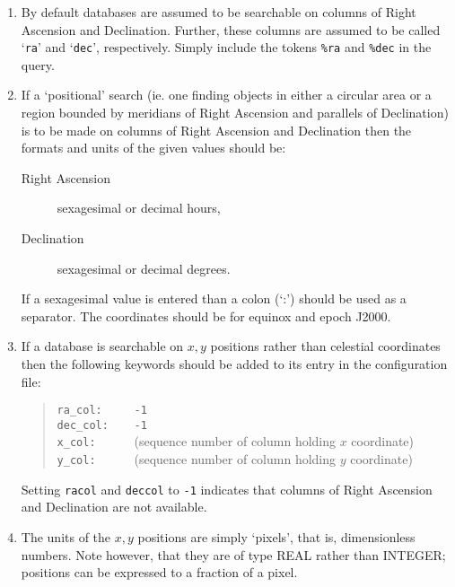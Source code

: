 \documentclass[twoside,11pt]{article}
\renewcommand{\_}{\texttt{\symbol{95}}}
\begin{document}
\begin{enumerate}

  \item By default databases are assumed to be searchable on columns
   of Right Ascension and Declination.  Further, these columns are
   assumed to be called `{\tt ra}' and `{\tt dec}', respectively.
   Simply include the tokens {\tt \%ra} and {\tt \%dec} in the query.

  \item If a `positional' search (ie. one finding objects in either a
   circular area or a region bounded by meridians of Right Ascension and
   parallels of Declination) is to be made on columns of Right Ascension
   and Declination then the formats and units of the given values should
   be:

  \begin{description}

    \item[Right Ascension] sexagesimal or decimal hours,

    \item[Declination] sexagesimal or decimal degrees.

  \end{description}

   If a sexagesimal value is entered than a colon (`:') should be used
   as a separator.  The coordinates should be for equinox and epoch J2000.

  \item If a database is searchable on $x,y$\/ positions rather than
   celestial coordinates then the following keywords should be added to
   its entry in the configuration file:

  \begin{quote}
    \verb+ra_col:     -1+  \\
    \verb+dec_col:    -1+  \\
    \verb+x_col:      +(sequence number of column holding $x$\/ coordinate) \\
    \verb+y_col:      +(sequence number of column holding $y$\/ coordinate)
  \end{quote}

   Setting {\tt ra\_col} and {\tt dec\_col} to {\tt -1} indicates that
   columns of Right Ascension and Declination are not available.

  \item The units of the $x,y$\/ positions are simply `pixels', that is,
   dimensionless numbers.  Note however, that they are of type REAL rather
   than INTEGER; positions can be expressed to a fraction of a pixel.


\end{enumerate}
\end{document}
